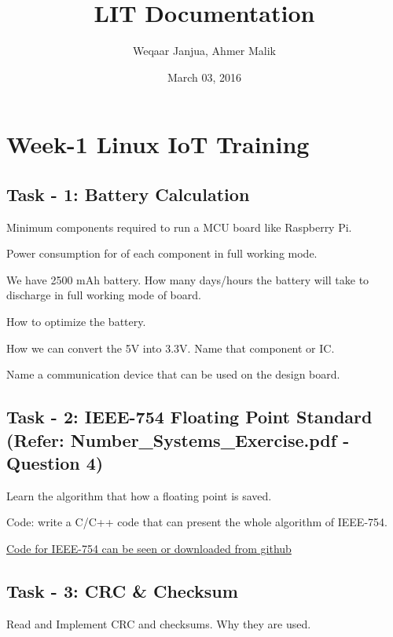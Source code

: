 \documentclass[letterpaper,10pt,english]{sphinxmanual}
\title{LIT Documentation}
\date{March 03, 2016}
\author{Weqaar Janjua, Ahmer Malik}
\begin{document}
\maketitle
\tableofcontents
{}\label{index::doc}



\chapter{Week-1 Linux IoT Training}
\label{week-01:user-guide-linuxiot-training}\label{week-01::doc}\label{week-01:week-1-linux-iot-training}\label{week-01:week-01}

\section{Task - 1: Battery Calculation}
\label{week-01:task-1-battery-calculation}
Minimum components required to run a MCU board like Raspberry Pi.

Power consumption for of each component in full working mode.

We have 2500 mAh battery. How many days/hours the battery will take to discharge in full working mode of board.

How to optimize the battery.

How we can convert the 5V into 3.3V. Name that component or IC.

Name a communication device that can be used on the design board.


\section{Task - 2: IEEE-754  Floating Point Standard (Refer: Number\_Systems\_Exercise.pdf -Question 4)}
\label{week-01:task-2-ieee-754-floating-point-standard-refer-number-systems-exercise-pdf-question-4}
Learn the algorithm that how a floating point is saved.

Code: write a C/C++ code that can present the whole algorithm of IEEE-754.

\href{https://github.com/Ahmer-444/personal-repo/blob/master/IEEE-754.c}{Code for IEEE-754 can be seen or downloaded from github}


\section{Task - 3: CRC \& Checksum}
\label{week-01:task-3-crc-checksum}
Read and Implement CRC and checksums. Why they are used.
\end{document}
